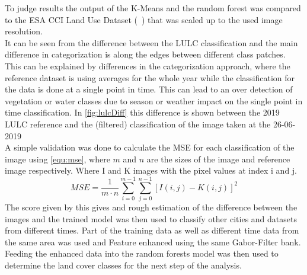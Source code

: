 \documentclass[12pt,a4paper, english,twoside]{article}
\begin{document}
      To judge results the output of the K-Means and the random forest was compared to the ESA CCI Land Use Dataset (~\autocite{landformclassicationusingfuzzykmeans2000}) that was scaled up to the used image resolution. \\
      It can be seen from the difference between the LULC classification and the main difference in categorization is along the edges between different class patches. 
      This can be explained by differences in the categorization approach, where the reference dataset is using averages for the whole year while the classification for the data is done at a single point in time. 
      This can lead to an over detection of vegetation or water classes due to season or weather impact on the single point in time classification.
      In \cref{fig:lulcDiff} this difference is shown between the 2019 LULC reference and the (filtered) classification of the image taken at the 26-06-2019
      \\ 
      A simple validation was done to calculate the \gls{MSE} for each classification of the image using \cref{equ:mse}, where  $m$ and $n$ are the sizes of the image and reference image respectively. Where I and K images with the pixel values at index i and j. 
      \begin{equation}\label{equ:mse}
        MSE = \frac{1}{m\cdot n}\sum_{i=0}^{m-1} \sum_{j=0}^{n-1} \left[I(i,j)-K(i,j)\right]^2
      \end{equation}
      The score given by this gives and rough estimation of the difference between the images and the trained model was then used to classify other cities and datasets from different times. 
      Part of the training data as well as different time data from the same area was used and Feature enhanced using the same Gabor-Filter bank.
      Feeding the enhanced data into the random forests model was then used to determine the land cover classes for the next step of the analysis.
\end{document}
